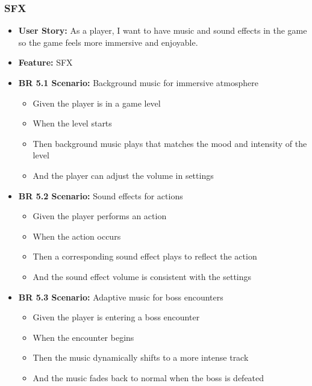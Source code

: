 \documentclass[11pt, a4paper]{article}
\begin{document}
\newpage

\subsubsection{SFX}

\begin{itemize}
    \item \textbf{User Story:} As a player, I want to have music and sound effects in the game so the game feels more immersive and enjoyable.

    \item \textbf{Feature:} SFX

    \item \textbf{BR 5.1 Scenario:} Background music for immersive atmosphere

          \begin{itemize}
              \item Given the player is in a game level
              \item When the level starts
              \item Then background music plays that matches the mood and intensity of the level
              \item And the player can adjust the volume in settings
          \end{itemize}

    \item \textbf{BR 5.2 Scenario:} Sound effects for actions

          \begin{itemize}
              \item Given the player performs an action
              \item When the action occurs
              \item Then a corresponding sound effect plays to reflect the action
              \item And the sound effect volume is consistent with the settings
          \end{itemize}

    \item \textbf{BR 5.3 Scenario:} Adaptive music for boss encounters

          \begin{itemize}
              \item Given the player is entering a boss encounter
              \item When the encounter begins
              \item Then the music dynamically shifts to a more intense track
              \item And the music fades back to normal when the boss is defeated
          \end{itemize}


\end{itemize}
\end{document}
